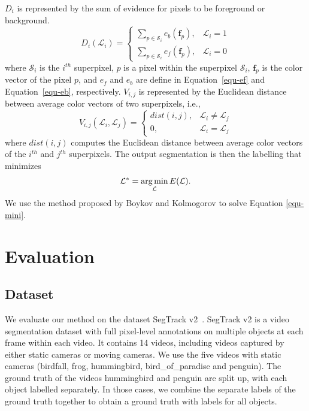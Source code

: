 $D_{i}$ is represented by the sum of evidence for pixels to be foreground or background.
\begin{equation}
	D_{i}(\mathcal{L}_{i})=
	\begin{cases}
		\sum_{p\in\mathcal{S}_{i}}e_{b}(\mathbf{f}_{p}), & \mathcal{L}_{i}=1\\
		\sum_{p\in\mathcal{S}_{i}}e_{f}(\mathbf{f}_{p}), & \mathcal{L}_{i}=0
	\end{cases}
\end{equation}
where $\mathcal{S}_{i}$ is the $i^{th}$ superpixel, $p$ is a pixel within the superpixel $\mathcal{S}_{i}$, $\mathbf{f}_{p}$ is the color vector of the pixel $p$, and $e_{f}$ and $e_{b}$ are define in Equation~\ref{equ-ef} and Equation~\ref{equ-eb}, respectively. $V_{i,j}$ is represented by the Euclidean distance between average color vectors of two superpixels, i.e.,
\begin{equation}
	V_{i,j}(\mathcal{L}_{i},\mathcal{L}_{j})=
	\begin{cases}
		dist(i,j), & \mathcal{L}_{i}\neq\mathcal{L}_{j}\\
		0, & \mathcal{L}_{i}=\mathcal{L}_{j}
	\end{cases}
\end{equation}
where $dist(i,j)$ computes the Euclidean distance between average color vectors of the $i^{th}$ and $j^{th}$ superpixels. The output segmentation is then the labelling that minimizes
\begin{equation}
	\label{equ-mini}
	\mathcal{L}^{*}=\operatorname*{arg\,min}_{\mathcal{L}}E(\mathcal{L}).
\end{equation}
We use the method proposed by Boykov and Kolmogorov \cite{boykov2004} to solve Equation \ref{equ-mini}.

\section{Evaluation}
\label{os-evaluation}

\subsection{Dataset}
\label{os-dataset}

We evaluate our method on the dataset SegTrack v2~\cite{f-li2013}. SegTrack v2 is a video segmentation dataset with full pixel-level annotations on multiple objects at each frame within each video.
It contains 14 videos, including videos captured by either static cameras or moving cameras. We use the five videos with static cameras (birdfall, frog, hummingbird, bird\_of\_paradise and penguin).
The ground truth of the videos hummingbird and penguin are split up, with each object labelled separately. In those cases, we combine the separate labels of the ground truth together to obtain a ground truth with labels for all objects.

